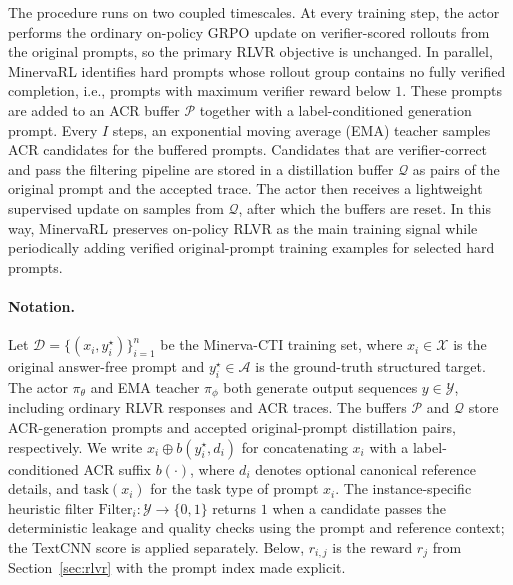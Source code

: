 The procedure runs on two coupled timescales. At every training step, the actor performs the ordinary on-policy GRPO update on verifier-scored rollouts from the original prompts, so the primary RLVR objective is unchanged. In parallel, MinervaRL identifies hard prompts whose rollout group contains no fully verified completion, i.e., prompts with maximum verifier reward below $1$. These prompts are added to an ACR buffer $\mathcal{P}$ together with a label-conditioned generation prompt. Every $I$ steps, an exponential moving average (EMA) teacher samples ACR candidates for the buffered prompts. Candidates that are verifier-correct and pass the filtering pipeline are stored in a distillation buffer $\mathcal{Q}$ as pairs of the original prompt and the accepted trace. The actor then receives a lightweight supervised update on samples from $\mathcal{Q}$, after which the buffers are reset. In this way, MinervaRL preserves on-policy RLVR as the main training signal while periodically adding verified original-prompt training examples for selected hard prompts.































\paragraph{Notation.}
Let $\mathcal{D}=\{(x_i,y_i^\star)\}_{i=1}^{n}$ be the Minerva-CTI training set, where $x_i\in\mathcal{X}$ is the original answer-free prompt and $y_i^\star\in\mathcal{A}$ is the ground-truth structured target. The actor $\pi_\theta$ and EMA teacher $\pi_\phi$ both generate output sequences $y\in\mathcal{Y}$, including ordinary RLVR responses and ACR traces. The buffers $\mathcal{P}$ and $\mathcal{Q}$ store ACR-generation prompts and accepted original-prompt distillation pairs, respectively. We write $x_i\oplus b(y_i^\star,d_i)$ for concatenating $x_i$ with a label-conditioned ACR suffix $b(\cdot)$, where $d_i$ denotes optional canonical reference details, and $\mathrm{task}(x_i)$ for the task type of prompt $x_i$. The instance-specific heuristic filter $\mathrm{Filter}_i:\mathcal{Y}\to\{0,1\}$ returns $1$ when a candidate passes the deterministic leakage and quality checks using the prompt and reference context; the TextCNN score is applied separately. Below, $r_{i,j}$ is the reward $r_j$ from Section~\ref{sec:rlvr} with the prompt index made explicit.

